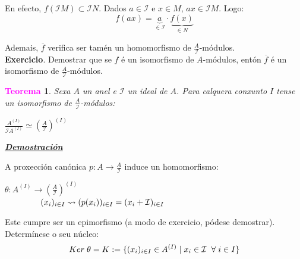 \documentclass[twoside]{report}
\newcommand{\magbf}[1]{\textcolor{magenta}{\textbf{#1}}} %
\theoremstyle{mystyle}
\newtheorem{theo}{\magbf{Teorema}}[chapter]
\newenvironment{theorem}
{\begin{mdframed}[linecolor = magenta,backgroundcolor = classicrose, linewidth = 2mm]\begin{theo}}
{\end{theo}\end{mdframed}}
\begin{document}
\noindent En efecto, $f(\mathcal{I}M) \subset \mathcal{I}N$. Dados $a \in \mathcal{I}$ e $x \in M$, $ax \in \mathcal{I}M$. Logo:
$$f(ax) = \underbrace{a}_{\in \mathcal{I}} \cdot \underbrace{f(x)}_{\in N}$$

\noindent Ademais, $\overline{f}$ verifica ser tamén un homomorfismo de $\displaystyle \frac{A}{\mathcal{I}}$-módulos.\\

\noindent \textbf{Exercicio}. Demostrar que se $f$ é un isomorfismo de $A$-módulos, entón $\overline{f}$ é un isomorfismo de $\displaystyle \frac{A}{\mathcal{I}}$-módulos.\\

\begin{theorem} \label{th3.5}
Sexa $A$ un anel e $\mathcal{I}$ un ideal de $A$. Para calquera conxunto $I$ tense un isomorfismo de $\displaystyle \frac{A}{\mathcal{I}}$-módulos:
\begin{center}
    $\displaystyle \frac{A^{(I)}}{\mathcal{I}A^{(I)}} \simeq \displaystyle \left( \frac{A}{\mathcal{I}} \right)^{(I)}$
\end{center}
\end{theorem}

\vspace{2mm}

\noindent \textbf{\textit{\underline{Demostración}}}

\vspace{2mm}

\noindent A proxección canónica $p: A \longrightarrow \displaystyle \frac{A}{\mathcal{I}}$ induce un homomorfismo:

\begin{center}
    $\theta: A^{(I)} \longrightarrow \displaystyle \left( \frac{A}{\mathcal{I}} \right)^{(I)}$\\
    \vspace{2mm}
    $\hspace{15mm} (x_{i})_{i \in I} \leadsto (p(x_{i}))_{i \in I} = (x_{i} + \mathcal{I})_{i \in I}$
\end{center}

\noindent Este cumpre ser un epimorfismo (a modo de exercicio, pódese demostrar). Determínese o seu núcleo:
$$Ker \hspace{1mm} \theta = K := \{(x_{i})_{i \in I} \in A^{(I)} \hspace{1mm} | \hspace{1mm} x_{i} \in \mathcal{I} \hspace{2mm} \forall \hspace{1mm} i \in I\}$$
\end{document}
